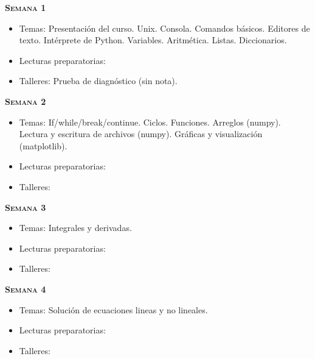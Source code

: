 \documentclass[letterpaper,10pt,onecolumn]{article}
\begin{document}
\noindent\textbf{\textsc{Semana 1}}\\[-0.5cm]
\begin{itemize}
\item Temas: 
Presentaci\'on del curso. Unix. Consola. Comandos b\'asicos. Editores
de texto. Int\'erprete de
Python. Variables. Aritm\'etica. Listas. Diccionarios.\\[-0.6cm] 
\item Lecturas preparatorias: \\[-0.6cm]
\item Talleres: Prueba de diagn\'ostico (sin nota). \\[-0.6cm]
\end{itemize}

\noindent\textbf{\textsc{Semana 2}}\\[-0.5cm]
\begin{itemize}
\item Temas: If/while/break/continue. Ciclos. Funciones. Arreglos
(numpy). Lectura y escritura de archivos (numpy). Gr\'aficas y
visualizaci\'on (matplotlib). \\[-0.6cm]
\item Lecturas preparatorias: \\[-0.6cm]
\item Talleres: \\[-0.6cm]
\end{itemize}

\noindent\textbf{\textsc{Semana 3}}\\[-0.5cm]
\begin{itemize}
\item Temas: Integrales y derivadas. \\[-0.6cm]
\item Lecturas preparatorias: \\[-0.6cm]
\item Talleres: \\[-0.6cm]
\end{itemize}

\noindent\textbf{\textsc{Semana 4}}\\[-0.5cm]
\begin{itemize}
\item Temas: Soluci\'on de ecuaciones lineas y no lineales.\\[-0.6cm]
\item Lecturas preparatorias: \\[-0.6cm]
\item Talleres: \\[-0.6cm]
\end{itemize}
\end{document}
